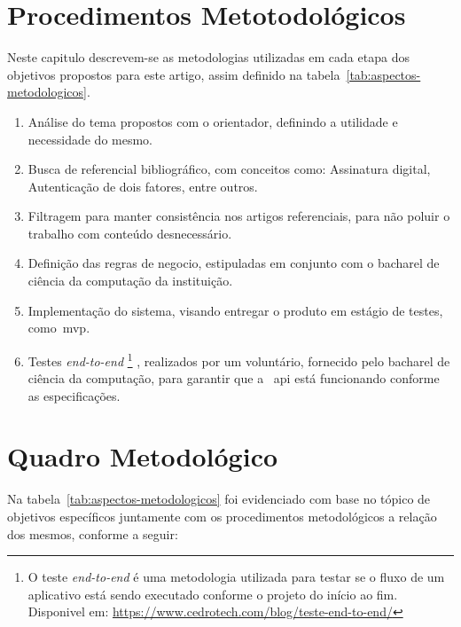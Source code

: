 \newcommand{\footnoteendtoend}{
    \footnote{
        O teste \textit{end-to-end} é uma metodologia utilizada para testar se
        o fluxo de um aplicativo está sendo executado conforme o projeto do
        início ao fim.
        Disponivel em: \url{https://www.cedrotech.com/blog/teste-end-to-end/}
    }
}
\section{Procedimentos Metotodológicos}\label{sec:quadro-relacional}

Neste capitulo descrevem-se as metodologias utilizadas em cada
etapa dos objetivos propostos para este artigo, assim definido na
tabela~\ref{tab:aspectos-metodologicos}.
\newcommand{\definicaoTema}{
    \item Análise do tema propostos com o orientador, definindo
    a utilidade e necessidade do mesmo.
}
\newcommand{\buscaArtigos}{
    \item Busca de referencial bibliográfico, com conceitos como:
    Assinatura digital, Autenticação de dois fatores, entre outros.
}
\newcommand{\filtragemArtigos}{
    \item Filtragem para manter consistência nos artigos referenciais,
    para não poluir o trabalho com conteúdo desnecessário.
}
\newcommand{\definicaoEspecificacoes}{
    \item Definição das regras de negocio, estipuladas em conjunto com o
    bacharel de ciência da computação da instituição.
}
\newcommand{\implementacaoAPI}{
    \item Implementação do sistema, visando entregar o produto em estágio
    de testes, como~\acrfull{mvp}.
}
\newcommand{\testeAPI}{
    \item Testes \textit{end-to-end}\footnoteendtoend, realizados por um voluntário,
    fornecido pelo bacharel de ciência da computação, para garantir que a
    ~\acrshort{api} está funcionando conforme as especificações.
}
\begin{enumerate}[label=\arabic*\textdegree\space Etapa:,
    leftmargin=2cm]
    \definicaoTema
    \buscaArtigos
    \filtragemArtigos
    \definicaoEspecificacoes
    \implementacaoAPI
    \testeAPI
\end{enumerate}
\section{Quadro Metodológico}\label{sec:quadro-metodologico}

Na tabela~\ref{tab:aspectos-metodologicos} foi evidenciado com base no
tópico de objetivos específicos juntamente com os procedimentos
metodológicos a relação dos mesmos, conforme a seguir:

